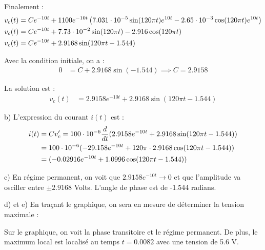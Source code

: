 Finalement :
\begin{align*}
    v_c(t) &= Ce^{-10t} + 1100e^{-10t}\left({7.031\cdot 10^{-5}\sin(120\pi t)e^{10t}
    -2.65\cdot 10^{-3}\cos(120\pi t)e^{10t}}\right) \\
    v_c(t) &= Ce^{-10t} +7.73\cdot 10^{-2}\sin(120\pi t)
    -2.916\cos(120\pi t) \\
    v_c(t) &= Ce^{-10t} +2.9168\sin(120\pi t -1.544)
\end{align*}

Avec la condition initiale, on a :
\begin{align*}
    0 &= C +2.9168\sin(-1.544)\implies C = 2.9158
\end{align*}

La solution est :
\begin{align*}
    v_c(t) &= 2.9158e^{-10t} +2.9168\sin(120\pi t -1.544)
\end{align*}

b) L'expression du courant $i(t)$ est :
\begin{align*}
    i(t) &= Cv_c' = 100\cdot 10^{-6}\dfrac{d }{d t}
    (2.9158e^{-10t} +2.9168\sin(120\pi t -1.544)) \\
    &= 100\cdot 10^{-6}
    (-29.158e^{-10t} +120\pi\cdot 2.9168\cos(120\pi t -1.544)) \\
    &= (-0.02916e^{-10t} +1.0996\cos(120\pi t -1.544))
\end{align*}

c) En régime permanent, on voit que $2.9158e^{-10t}\to 0$ et que l'amplitude
va osciller entre $\pm 2.9168$ Volts. L'angle de phase est de -1.544 radians.
\vspace{5mm}

d) et e) En traçant le graphique, on sera en mesure de déterminer la tension
maximale :
\begin{center}
\end{center}

Sur le graphique, on voit la phase transitoire et le régime permanent. De plus,
le maximum local est localisé au temps $t=0.0082$ avec une tension de 5.6 V.
